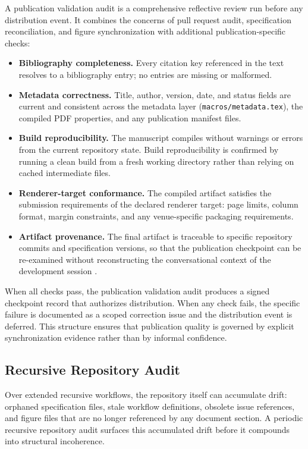 A publication validation audit is a comprehensive reflective review run before any distribution event. It combines the concerns of pull request audit, specification reconciliation, and figure synchronization with additional publication-specific checks:

\begin{itemize}
  \item \textbf{Bibliography completeness.} Every citation key referenced in the text resolves to a bibliography entry; no entries are missing or malformed.
  \item \textbf{Metadata correctness.} Title, author, version, date, and status fields are current and consistent across the metadata layer (\texttt{macros/metadata.tex}), the compiled PDF properties, and any publication manifest files.
  \item \textbf{Build reproducibility.} The manuscript compiles without warnings or errors from the current repository state. Build reproducibility is confirmed by running a clean build from a fresh working directory rather than relying on cached intermediate files.
  \item \textbf{Renderer-target conformance.} The compiled artifact satisfies the submission requirements of the declared renderer target: page limits, column format, margin constraints, and any venue-specific packaging requirements.
  \item \textbf{Artifact provenance.} The final artifact is traceable to specific repository commits and specification versions, so that the publication checkpoint can be re-examined without reconstructing the conversational context of the development session \cite{Lamport1978TimeClocks}.
\end{itemize}

When all checks pass, the publication validation audit produces a signed checkpoint record that authorizes distribution. When any check fails, the specific failure is documented as a scoped correction issue and the distribution event is deferred. This structure ensures that publication quality is governed by explicit synchronization evidence rather than by informal confidence.

\subsection{Recursive Repository Audit}

Over extended recursive workflows, the repository itself can accumulate drift: orphaned specification files, stale workflow definitions, obsolete issue references, and figure files that are no longer referenced by any document section. A periodic recursive repository audit surfaces this accumulated drift before it compounds into structural incoherence.

